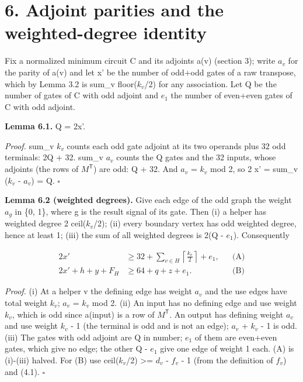 \hypertarget{adjoint-parities-and-the-weighted-degree-identity}{%
\section{6. Adjoint parities and the weighted-degree identity}\label{adjoint-parities-and-the-weighted-degree-identity}}

Fix a normalized minimum circuit C and its adjoints a(v) (section 3); write \(a_v\) for the parity of a(v) and let x' be the number of odd+odd gates of a raw transpose, which by Lemma 3.2 is sum\_v floor(\(k_v\)/2) for any association. Let Q be the number of gates of C with odd adjoint and \(e_1\) the number of even+even gates of C with odd adjoint.

\textbf{Lemma 6.1.} Q = 2x'.

\emph{Proof.} sum\_v \(k_v\) counts each odd gate adjoint at its two operands plus 32 odd terminals: 2Q + 32. sum\_v \(a_v\) counts the Q gates and the 32 inputs, whose adjoints (the rows of \(M^{\mathsf T}\)) are odd: Q + 32. And \(a_v\) = \(k_v\) mod 2, so 2 x' = sum\_v (\(k_v\) - \(a_v\)) = Q. \(\square\)

\textbf{Lemma 6.2 (weighted degrees).} Give each edge of the odd graph the weight \(a_g\) in \{0, 1\}, where g is the result signal of its gate. Then (i) a helper has weighted degree 2 ceil(\(k_v\)/2); (ii) every boundary vertex has odd weighted degree, hence at least 1; (iii) the sum of all weighted degrees is 2(Q - \(e_1\)). Consequently

\[
\begin{aligned}
2x'&\ge32+\sum_{v\in H}\left\lceil\frac{k_v}{2}\right\rceil+e_1,&&\text{(A)}\\
2x'+h+y+F_H&\ge64+q+z+e_1.&&\text{(B)}
\end{aligned}
\]

\emph{Proof.} (i) At a helper v the defining edge has weight \(a_v\) and the use edges have total weight \(k_v\); \(a_v\) = \(k_v\) mod 2. (ii) An input has no defining edge and use weight \(k_v\), which is odd since a(input) is a row of \(M^{\mathsf T}\). An output has defining weight \(a_v\) and use weight \(k_v\) - 1 (the terminal is odd and is not an edge); \(a_v\) + \(k_v\) - 1 is odd. (iii) The gates with odd adjoint are Q in number; \(e_1\) of them are even+even gates, which give no edge; the other Q - \(e_1\) give one edge of weight 1 each. (A) is (i)-(iii) halved. For (B) use ceil(\(k_v\)/2) \textgreater= \(d_v\) - \(f_v\) - 1 (from the definition of \(f_v\)) and (4.1). \(\square\)

